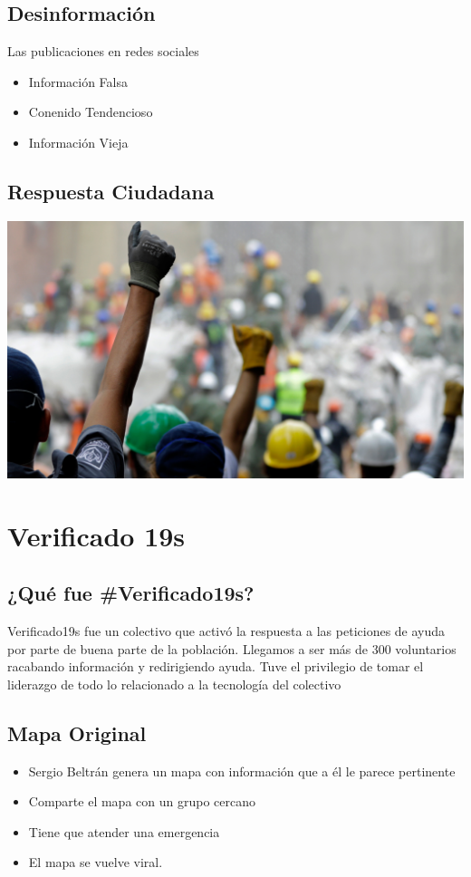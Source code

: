 \documentclass[11pt]{article}
\begin{document}
\subsection{Desinformación}
\label{sec:orgb8c99e0}
Las publicaciones en redes sociales
\begin{itemize}
\item Información Falsa
\item Conenido Tendencioso
\item Información Vieja
\end{itemize}
\subsection{Respuesta Ciudadana}
\label{sec:org9cc57ec}
\begin{center}
\includegraphics[width=.9\linewidth]{./img/sismoimg.jpeg}
\end{center}


\section{Verificado 19s}
\label{sec:orgc43bfee}
\subsection{¿Qué fue \#Verificado19s?}
\label{sec:org249b599}
Verificado19s fue un colectivo que activó la respuesta a las peticiones de ayuda por parte de buena parte de la población. Llegamos a ser más de 300 voluntarios racabando información y redirigiendo ayuda.
Tuve el privilegio de tomar el liderazgo de todo lo relacionado a la tecnología del colectivo

\subsection{Mapa Original}
\label{sec:org4316144}
\begin{itemize}
\item Sergio Beltrán genera un mapa con información que a él le parece pertinente
\item Comparte el mapa con un grupo cercano
\item Tiene que atender una emergencia
\item El mapa se vuelve viral.
\end{itemize}
\end{document}
